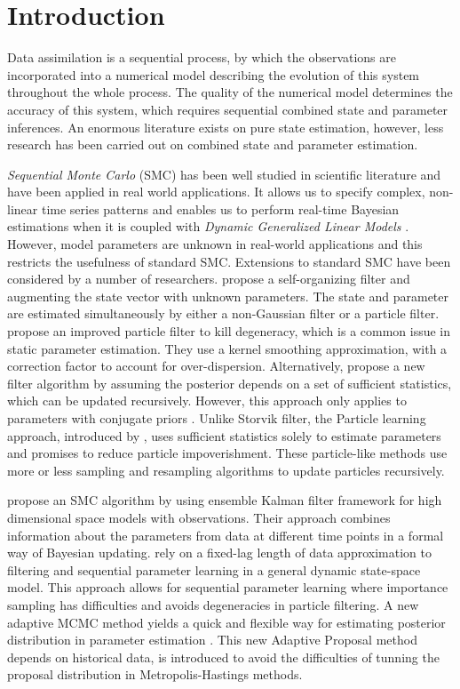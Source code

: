 
\section{Introduction}

Data assimilation is a sequential process, by which the observations are incorporated into a numerical model describing the evolution of this system throughout the whole process. The quality of the numerical model determines the accuracy of this system, which requires sequential combined state and parameter inferences. An enormous literature exists on pure state estimation, however, less research has been carried out on combined state and parameter estimation.

\textit{Sequential Monte Carlo} (SMC) has been well studied in scientific literature and have been applied in real world applications. It allows us to specify complex, non-linear time series patterns and enables us to perform real-time Bayesian estimations when it is coupled with \textit{Dynamic Generalized Linear Models} \citep{vieira2016online}. However, model parameters are unknown in real-world applications and this restricts the usefulness of standard SMC. Extensions to standard SMC have been considered by a number of researchers. \cite{kitagawa1998self} propose a self-organizing filter and augmenting the state vector with unknown parameters. The state and parameter are estimated simultaneously by either a non-Gaussian filter or a particle filter. \cite{liu2001combined} propose an improved particle filter to kill degeneracy, which is a common issue in static parameter estimation. They use a kernel smoothing approximation, with a correction factor to account for over-dispersion. Alternatively, \cite{storvik2002particle} propose a new filter algorithm by assuming the posterior depends on a set of sufficient statistics, which can be updated recursively. However, this approach only applies to parameters with conjugate priors \citep{stroud2016bayesian}. Unlike Storvik filter, the Particle learning approach, introduced by \cite{carvalho2010particle}, uses sufficient statistics solely to estimate parameters and promises to reduce particle impoverishment. These particle-like methods use more or less sampling and resampling algorithms to update particles recursively. 

\cite{stroud2016bayesian} propose an SMC algorithm by using ensemble Kalman filter framework for high dimensional space models with observations. Their approach combines information about the parameters from data at different time points in a formal way of Bayesian updating. \cite{polson2008practical} rely on a fixed-lag length of data approximation to filtering and sequential parameter learning in a general dynamic state-space model. This approach allows for sequential parameter learning where importance sampling has difficulties and avoids degeneracies in particle filtering. A new adaptive MCMC method yields a quick and flexible way for estimating posterior distribution in parameter estimation \citep{haario1999adaptive}. This new Adaptive Proposal method depends on historical data, is introduced to avoid the difficulties of tunning the proposal distribution in Metropolis-Hastings methods. 



